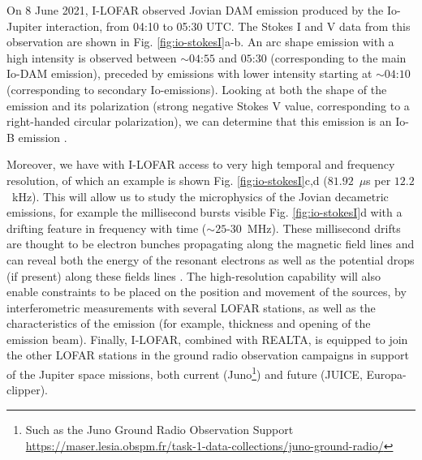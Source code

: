 
On 8 June 2021, I-LOFAR observed Jovian DAM emission produced by the Io-Jupiter interaction, from 04:10 to 05:30 UTC. The Stokes I and V data from this observation are shown in Fig. \ref{fig:io-stokesI}a-b. An arc shape emission with a high intensity is observed between $\sim 04$:$55$ and $05$:$30$ (corresponding to the main Io-DAM emission), preceded by emissions with lower intensity starting at $\sim 04$:$10$ (corresponding to secondary Io-emissions). Looking at both the shape of the emission and its polarization (strong negative Stokes V value, corresponding to a right-handed circular polarization), we can determine that this emission is an Io-B emission \citep[coming from the north-dawn side of Jupiter, see][for example]{Marques2017}.

Moreover, we have with I-LOFAR access to very high temporal and frequency resolution, of which an example is shown Fig. \ref{fig:io-stokesI}c,d ($81.92$~$\mu$s per $12.2$~kHz). This will allow us to study the microphysics of the Jovian decametric emissions, for example the millisecond bursts visible Fig. \ref{fig:io-stokesI}d with a drifting feature in frequency with time ($\sim 25$-$30$~MHz). These millisecond drifts are thought to be electron bunches propagating along the magnetic field lines and can reveal both the energy of the resonant electrons as well as the potential drops (if present) along these fields lines \citep{Hess2007, Hess2009}. The high-resolution capability will also enable constraints to be placed on the position and movement of the sources, by interferometric measurements with several LOFAR stations, as well as the characteristics of the emission (for example, thickness and opening of the emission beam). Finally, I-LOFAR, combined with REALTA, is equipped to join the other LOFAR stations in the ground radio observation campaigns in support of the Jupiter space missions, both current (Juno\footnote{Such as the Juno Ground Radio Observation Support \hyperref[Juno]{https://maser.lesia.obspm.fr/task-1-data-collections/juno-ground-radio/}}) and future (JUICE, Europa-clipper).

